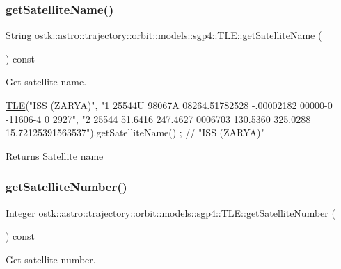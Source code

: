 \subsubsection{\texorpdfstring{get\+Satellite\+Name()}{getSatelliteName()}}
{\footnotesize\ttfamily String ostk\+::astro\+::trajectory\+::orbit\+::models\+::sgp4\+::\+T\+L\+E\+::get\+Satellite\+Name (\begin{DoxyParamCaption}{ }\end{DoxyParamCaption}) const}



Get satellite name. 


\begin{DoxyCode}
\hyperlink{classostk_1_1astro_1_1trajectory_1_1orbit_1_1models_1_1sgp4_1_1_t_l_e_a57323db2c24577c2e8ddce79fa776d1e}{TLE}(\textcolor{stringliteral}{"ISS (ZARYA)"},
    \textcolor{stringliteral}{"1 25544U 98067A   08264.51782528 -.00002182  00000-0 -11606-4 0  2927"},
    \textcolor{stringliteral}{"2 25544  51.6416 247.4627 0006703 130.5360 325.0288 15.72125391563537"}).getSatelliteName() ; \textcolor{comment}{// "ISS
       (ZARYA)"}
\end{DoxyCode}


\begin{DoxyReturn}{Returns}
Satellite name 
\end{DoxyReturn}
\mbox{\label{classostk_1_1astro_1_1trajectory_1_1orbit_1_1models_1_1sgp4_1_1_t_l_e_a63c9241a31234dd07ee4ca4424a9df5f}} 
\subsubsection{\texorpdfstring{get\+Satellite\+Number()}{getSatelliteNumber()}}
{\footnotesize\ttfamily Integer ostk\+::astro\+::trajectory\+::orbit\+::models\+::sgp4\+::\+T\+L\+E\+::get\+Satellite\+Number (\begin{DoxyParamCaption}{ }\end{DoxyParamCaption}) const}



Get satellite number. 

